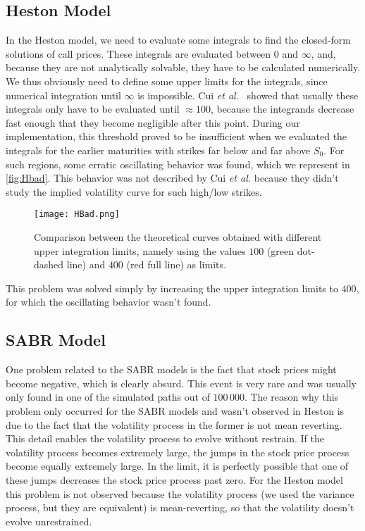 \vspace{\fill}
\newpage

\subsection{Heston Model}
In the Heston model, we need to evaluate some integrals to find the closed-form solutions of call prices.
These integrals are evaluated between $0$ and $\infty$, and, because they are not analytically solvable, they have to be calculated numerically.
We thus obviously need to define some upper limits for the integrals, since numerical integration until $\infty$ is impossible. Cui \textit{et al.}~\citep{Cui} showed that usually these integrals only have to be evaluated until $\approx100$, because the integrands decrease fast enough that they become negligible after this point. During our implementation, this threshold proved to be insufficient when we evaluated the integrals for the earlier maturities with strikes far below and far above $S_0$. For such regions, some erratic oscillating behavior was found, which we represent in \autoref{fig:Hbad}. This behavior was not described by Cui \textit{et al.} because they didn't study the implied volatility curve for such high/low strikes.



\begin{figure}[H]
    \centering
      \texttt{[image: HBad.png]}
      \caption[Comparison between the theoretical curves obtained with different upper integration limits.]{Comparison between the theoretical curves obtained with different upper integration limits, namely using the values $100$ (green dot-dashed line) and $400$ (red full line) as limits.}\label{fig:Hbad}
    \end{figure}

This problem was solved simply by increasing the upper integration limits to $400$, for which the oscillating behavior wasn't found.



\subsection{SABR Model}
One problem related to the SABR models is the fact that stock prices might become negative, which is clearly absurd. This event is very rare and was usually only found in one of the simulated paths out of $100\,000$.
The reason why this problem only occurred for the SABR models and wasn't observed in Heston is due to the fact that the volatility process in the former is not mean reverting.
This detail enables the volatility process to evolve without restrain. If the volatility process becomes extremely large, the jumps in the stock price process become equally extremely large. In the limit, it is perfectly possible that one of these jumps decreases the stock price process past zero. For the Heston model this problem is not observed because the volatility process (we used the variance process, but they are equivalent) is mean-reverting, so that the volatility doesn't evolve unrestrained.

